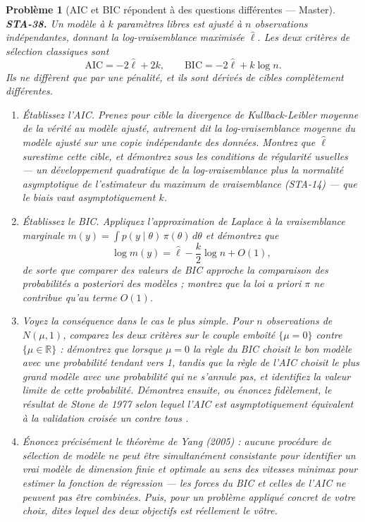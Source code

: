 \documentclass[11pt]{article}
\newtheorem{problem}{Problème}
\begin{document}
\begin{problem}[{AIC et BIC répondent à des questions différentes --- Master}]
\textbf{STA-38.} Un modèle à $ k $ paramètres libres est ajusté à $ n $ observations
indépendantes, donnant la log-vraisemblance maximisée $ \hat{\ell} $. Les deux critères de
sélection classiques sont
\[ \mathrm{AIC} = -2\hat{\ell} + 2k , \qquad \mathrm{BIC} = -2\hat{\ell} + k \log n . \]
Ils ne diffèrent que par une pénalité, et ils sont dérivés de cibles complètement différentes.
\begin{enumerate}
\item[(a)] Établissez l'AIC. Prenez pour cible la divergence de Kullback-Leibler moyenne de la vérité au
modèle ajusté, autrement dit la log-vraisemblance moyenne du modèle ajusté sur une copie
indépendante des données. Montrez que $ \hat{\ell} $ surestime cette cible, et démontrez sous les
conditions de régularité usuelles --- un développement quadratique de la log-vraisemblance plus la
normalité asymptotique de l'estimateur du maximum de vraisemblance (STA-14) --- que le biais vaut
asymptotiquement $ k $.
\item[(b)] Établissez le BIC. Appliquez l'approximation de Laplace à la vraisemblance marginale
$ m(y) = \int p(y \mid \theta)\, \pi(\theta)\, d\theta $ et démontrez que
\[ \log m(y) = \hat{\ell} - \frac{k}{2}\log n + O(1) , \]
de sorte que comparer des valeurs de BIC approche la comparaison des probabilités a posteriori des
modèles ; montrez que la loi a priori $ \pi $ ne contribue qu'au terme $ O(1) $.
\item[(c)] Voyez la conséquence dans le cas le plus simple. Pour $ n $ observations de
$ N(\mu, 1) $, comparez les deux critères sur le couple emboîté $ \{\mu = 0\} $ contre
$ \{\mu \in \mathbb{R}\} $ : démontrez que lorsque $ \mu = 0 $ la règle du BIC choisit le bon
modèle avec une probabilité tendant vers 1, tandis que la règle de l'AIC choisit le plus grand
modèle avec une probabilité qui ne s'annule pas, et identifiez la valeur limite de cette
probabilité. Démontrez ensuite, ou énoncez fidèlement, le résultat de Stone de 1977 selon lequel
l'AIC est asymptotiquement équivalent à la validation croisée \og{} un contre tous \fg{}.
\item[(d)] Énoncez précisément le théorème de Yang (2005) : aucune procédure de sélection de modèle ne
peut être simultanément consistante pour identifier un vrai modèle de dimension finie et optimale
au sens des vitesses minimax pour estimer la fonction de régression --- les forces du BIC et celles
de l'AIC ne peuvent pas être combinées. Puis, pour un problème appliqué concret de votre choix,
dites lequel des deux objectifs est réellement le vôtre.
\end{enumerate}

\end{problem}
\end{document}
